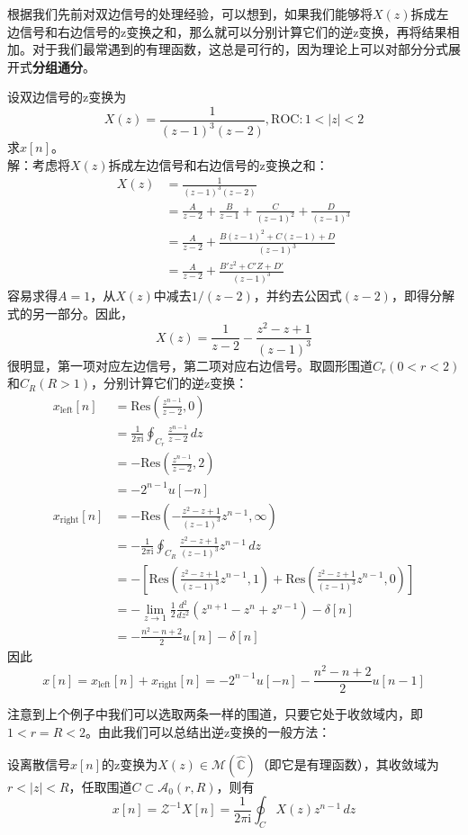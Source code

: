 根据我们先前对双边信号的处理经验，可以想到，如果我们能够将$X(z)$拆成左边信号和右边信号的z变换之和，那么就可以分别计算它们的逆z变换，再将结果相加。对于我们最常遇到的有理函数，这总是可行的，因为理论上可以对部分分式展开式\textbf{分组通分}。
\begin{example}
    设双边信号的z变换为
    \[X(z)=\frac{1}{(z-1)^3(z-2)},\mathrm{ROC}:1<|z|<2\]
    求$x[n]$。\\
    解：考虑将$X(z)$拆成左边信号和右边信号的z变换之和：
    \begin{align*}
        X(z)&=\frac{1}{(z-1)^3(z-2)}\\
        &=\frac{A}{z-2}+\frac{B}{z-1}+\frac{C}{(z-1)^2}+\frac{D}{(z-1)^3}\\
        &=\frac{A}{z-2}+\frac{B(z-1)^2+C(z-1)+D}{(z-1)^3}\\
        &=\frac{A}{z-2}+\frac{B'z^2+C'Z+D'}{(z-1)^3}
    \end{align*}
    容易求得$A=1$，从$X(z)$中减去$1/(z-2)$，并约去公因式$(z-2)$，即得分解式的另一部分。因此，
    \[X(z)=\frac{1}{z-2}-\frac{z^2-z+1}{(z-1)^3}\]
    很明显，第一项对应左边信号，第二项对应右边信号。取圆形围道$C_r(0<r<2)$和$C_R(R>1)$，分别计算它们的逆z变换：
    \begin{align*}
        x_{\text{left}}[n]&=\mathrm{Res}\left(\frac{z^{n-1}}{z-2},0\right)\\
        &=\frac{1}{2\pi \mathrm{i}}\oint_{C_r}\frac{z^{n-1}}{z-2}\,dz\\
        &=-\mathrm{Res}\left(\frac{z^{n-1}}{z-2},2\right)\\
        &=-2^{n-1}u[-n]\\
        x_{\text{right}}[n]&=-\mathrm{Res}\left(-\frac{z^2-z+1}{(z-1)^3}z^{n-1},\infty\right)\\
        &=-\frac{1}{2\pi \mathrm{i}}\oint_{C_R}\frac{z^2-z+1}{(z-1)^3}z^{n-1}\,dz\\
        &=-\left[\mathrm{Res}\left(\frac{z^2-z+1}{(z-1)^3}z^{n-1},1\right)+\mathrm{Res}\left(\frac{z^2-z+1}{(z-1)^3}z^{n-1},0\right)\right]\\
        &=-\lim_{z\to 1}\frac{1}{2}\frac{d^2}{dz^2}\left(z^{n+1}-z^{n}+z^{n-1}\right)-\delta[n]\\
        &=-\frac{n^2-n+2}{2}u[n]-\delta[n]
    \end{align*}
    因此
    \[x[n]=x_{\text{left}}[n]+x_{\text{right}}[n]=-2^{n-1}u[-n]-\frac{n^2-n+2}{2}u[n-1]\]
\end{example}

注意到上个例子中我们可以选取两条一样的围道，只要它处于收敛域内，即$1<r=R<2$。由此我们可以总结出逆z变换的一般方法：
\begin{theorem}
    设离散信号$x[n]$的z变换为$X(z)\in\mathcal{M} \left(\hat{\mathbb{C}}\right)$（即它是有理函数），其收敛域为$r<|z|<R$，任取围道$C\subset\mathcal{A} _0(r,R)$，则有
    \[x[n]=\mathcal{Z} ^{-1}X[n]=\frac{1}{2\pi \mathrm{i}}\oint_{C}X(z)z^{n-1}\,dz\]
\end{theorem}

